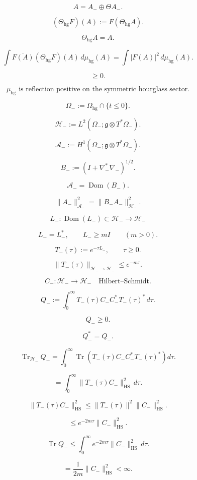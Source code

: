 \documentclass[11pt]{article}
\begin{document}
\[
A=A_-\oplus\Theta A_-.
\]

\[
(\Theta_{\mathrm{hg}}F)(A)
:=
F(\Theta_{\mathrm{hg}}A).
\]

\[
\Theta_{\mathrm{hg}}A=A.
\]

\[
\int \overline{F(A)}(\Theta_{\mathrm{hg}}F)(A)\,d\mu_{\mathrm{hg}}(A)
=
\int |F(A)|^2\,d\mu_{\mathrm{hg}}(A).
\]

\[
\ge0.
\]

\[
\boxed{
\mu_{\mathrm{hg}}
\text{ is reflection positive on the symmetric hourglass sector.}
}
\]

\[
\Omega_-
:=
\Omega_{\mathrm{hg}}\cap\{t\le 0\}.
\]

\[
\mathcal H_-
:=
L^2(\Omega_-;\mathfrak g\otimes T^\ast\Omega_-).
\]

\[
\mathcal A_-
:=
H^1(\Omega_-;\mathfrak g\otimes T^\ast\Omega_-).
\]

\[
B_-:=(I+\nabla_-^\ast\nabla_-)^{1/2}.
\]

\[
\mathcal A_-=\operatorname{Dom}(B_-).
\]

\[
\|A_-\|_{\mathcal A_-}^2
=
\|B_-A_-\|_{\mathcal H_-}^2.
\]

\[
L_-:\operatorname{Dom}(L_-)\subset\mathcal H_-\to\mathcal H_-
\]

\[
L_-=L_-^\ast,
\qquad
L_-\ge mI
\qquad
(m>0).
\]

\[
T_-(\tau):=e^{-\tau L_-},
\qquad
\tau\ge0.
\]

\[
\|T_-(\tau)\|_{\mathcal H_-\to\mathcal H_-}
\le
e^{-m\tau}.
\]

\[
C_-:\mathcal H_-\to\mathcal H_-
\quad
\text{Hilbert--Schmidt}.
\]

\[
Q_-
:=
\int_0^\infty
T_-(\tau)C_-C_-^\ast T_-(\tau)^\ast\,d\tau.
\]

\[
Q_-\ge0.
\]

\[
Q_-^\ast=Q_-.
\]

\[
\operatorname{Tr}_{\mathcal H_-}Q_-
=
\int_0^\infty
\operatorname{Tr}
\left(
T_-(\tau)C_-C_-^\ast T_-(\tau)^\ast
\right)
d\tau.
\]

\[
=
\int_0^\infty
\|T_-(\tau)C_-\|_{\mathrm{HS}}^2\,d\tau.
\]

\[
\|T_-(\tau)C_-\|_{\mathrm{HS}}^2
\le
\|T_-(\tau)\|^2\|C_-\|_{\mathrm{HS}}^2.
\]

\[
\le
e^{-2m\tau}\|C_-\|_{\mathrm{HS}}^2.
\]

\[
\operatorname{Tr}Q_-
\le
\int_0^\infty
e^{-2m\tau}\|C_-\|_{\mathrm{HS}}^2\,d\tau.
\]

\[
=
\frac{1}{2m}\|C_-\|_{\mathrm{HS}}^2
<\infty.
\]
\end{document}

